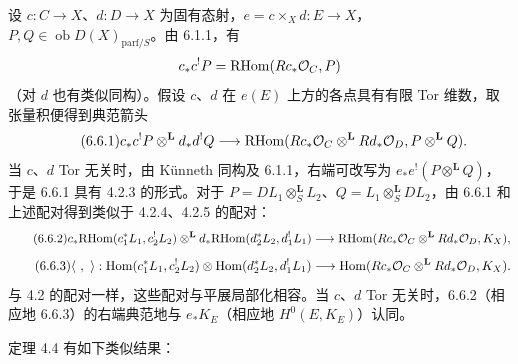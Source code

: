 设 $c:C\to X$、$d:D\to X$ 为固有态射，$e=c\times_Xd:E\to X$，$P,Q\in\operatorname{ob}D(X)_{\mathrm{parf}/S}$。由 6.1.1，有
\[
c_*c^!P=\mathrm{RHom}(Rc_*\mathcal{O}_C,P)
\]
（对 $d$ 也有类似同构）。假设 $c$、$d$ 在 $e(E)$ 上方的各点具有有限 Tor 维数，取张量积便得到典范箭头
\begin{equation}
\tag{6.6.1}
c_*c^!P\otimes^{\mathbf L}d_*d^!Q\longrightarrow
\mathrm{RHom}(Rc_*\mathcal{O}_C\otimes^{\mathbf L}Rd_*\mathcal{O}_D,P\otimes^{\mathbf L}Q).
\end{equation}
当 $c$、$d$ Tor 无关时，由 Künneth 同构及 6.1.1，右端可改写为 $e_*e^!(P\otimes^{\mathbf L}Q)$，于是 6.6.1 具有 4.2.3 的形式。对于 $P=DL_1\otimes_S^{\mathbf L}L_2$、$Q=L_1\otimes_S^{\mathbf L}DL_2$，由 6.6.1 和上述配对得到类似于 4.2.4、4.2.5 的配对：
\begin{equation}
\tag{6.6.2}
c_*\mathrm{RHom}(c_1^*L_1,c_2^!L_2)\otimes^{\mathbf L}d_*\mathrm{RHom}(d_2^*L_2,d_1^!L_1)
\longrightarrow\mathrm{RHom}(Rc_*\mathcal{O}_C\otimes^{\mathbf L}Rd_*\mathcal{O}_D,K_X),
\end{equation}
\begin{equation}
\tag{6.6.3}
\langle\ ,\ \rangle:\Hom(c_1^*L_1,c_2^!L_2)\otimes\Hom(d_2^*L_2,d_1^!L_1)
\longrightarrow\Hom(Rc_*\cO_C\otimes^{\mathbf L}Rd_*\cO_D,K_X).
\end{equation}
与 4.2 的配对一样，这些配对与平展局部化相容。当 $c$、$d$ Tor 无关时，6.6.2（相应地 6.6.3）的右端典范地与 $e_*K_E$（相应地 $H^0(E,K_E)$）认同。

定理 4.4 有如下类似结果：

